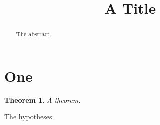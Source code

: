 \documentclass[aap]{arximspdf}
\newtheorem{Th}{Theorem}[section]
\begin{document}
\begin{frontmatter}
\title{A Title}
\begin{aug}
\author{ }
\end{aug}
\begin{abstract}The abstract.\end{abstract}
\begin{keyword}[class=AMS]
\end{keyword}
\begin{keyword}
\end{keyword}
\end{frontmatter}
\section{One}
\begin{Th}A theorem.\end{Th}
\begin{hy*}The hypotheses.\end{hy*}
\end{document}

